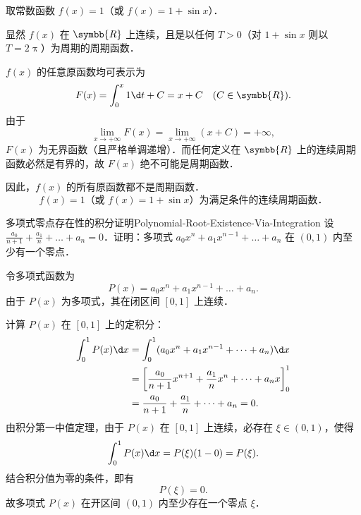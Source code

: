 \begin{solution}
    取常数函数 $f(x) = 1$（或 $f(x) = 1 + \sin x$）．

    显然 $f(x)$ 在 $\symbb{R}$ 上连续，且是以任何 $T > 0$（对 $1 + \sin x$ 则以 $T = 2\uppi$）为周期的周期函数．

    $f(x)$ 的任意原函数均可表示为
    \begin{equation}
        F(x) = \int_0^x 1 \d t + C = x + C \quad (C \in \symbb{R}).
    \end{equation}
    由于
    \begin{equation}
        \lim_{x\to +\infty} F(x) = \lim_{x\to +\infty} (x + C) = +\infty,
    \end{equation}
    $F(x)$ 为无界函数（且严格单调递增）．而任何定义在 $\symbb{R}$ 上的连续周期函数必然是有界的，故 $F(x)$ 绝不可能是周期函数．

    因此，$f(x)$ 的所有原函数都不是周期函数．
    \begin{equation}
        \boxed{f(x) = 1 \text{（或 } f(x) = 1 + \sin x\text{）为满足条件的连续周期函数．}}
    \end{equation}
\end{solution}

\begin{problem}{多项式零点存在性的积分证明}{Polynomial-Root-Existence-Via-Integration}
    设 $\frac{a_0}{n+1} + \frac{a_1}{n} + \dots + a_n = 0$．证明：多项式 $a_0 x^n + a_1 x^{n-1} + \dots + a_n$ 在 $(0, 1)$ 内至少有一个零点．
\end{problem}

\begin{myproof}
    令多项式函数为
    \begin{equation}
        P(x) = a_0 x^n + a_1 x^{n-1} + \dots + a_n.
    \end{equation}
    由于 $P(x)$ 为多项式，其在闭区间 $[0, 1]$ 上连续．

    计算 $P(x)$ 在 $[0, 1]$ 上的定积分：
    \begin{equation}
        \begin{aligned}
            \int_0^1 P(x) \d x & = \int_0^1 (a_0 x^n + a_1 x^{n-1} + \dots + a_n) \d x                          \\
                               & = \left[ \frac{a_0}{n+1}x^{n+1} + \frac{a_1}{n}x^n + \dots + a_n x \right]_0^1 \\
                               & = \frac{a_0}{n+1} + \frac{a_1}{n} + \dots + a_n = 0.
        \end{aligned}
    \end{equation}
    由积分第一中值定理，由于 $P(x)$ 在 $[0, 1]$ 上连续，必存在 $\xi \in (0, 1)$，使得
    \begin{equation}
        \int_0^1 P(x) \d x = P(\xi)(1 - 0) = P(\xi).
    \end{equation}
    结合积分值为零的条件，即有
    \begin{equation}
        P(\xi) = 0.
    \end{equation}
    故多项式 $P(x)$ 在开区间 $(0, 1)$ 内至少存在一个零点 $\xi$．
\end{myproof}


